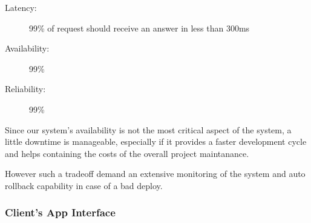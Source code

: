 \documentclass[11pt]{article} %
\begin{document}
\begin{description}
	\item[Latency:] 99\% of request should receive an answer in less than 300ms
	\item[Availability:] 99\%
	\item[Reliability:] 99\%
\end{description}

Since our system's availability is not the most critical aspect of the system, a little downtime is manageable, especially if it provides a faster development cycle and helps containing the costs of the overall project maintanance. 
 
However such a tradeoff demand an extensive monitoring of the system and auto rollback capability in case of a bad deploy.

\subsubsection{Client's App Interface}
\end{document}

